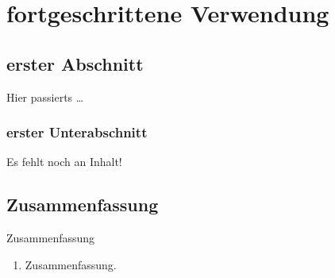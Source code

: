 \chapter{fortgeschrittene Verwendung}


\website

\section{erster Abschnitt}

\begin{Frame}{Hier passierts}
  \ldots
\end{Frame}

\subsection{erster Unterabschnitt}

\begin{Frame}
  Es fehlt noch an Inhalt!
\end{Frame}

\section*{Zusammenfassung}

\begin{frame}{Zusammenfassung}
  \begin{enumerate}
    \item Zusammenfassung.
  \end{enumerate}
\end{frame}